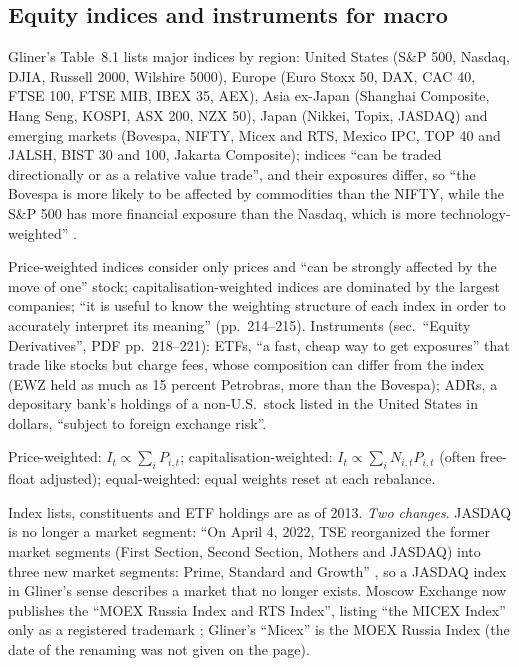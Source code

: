 \subsection{Equity indices and instruments for macro}

\begin{qfdefinition}\label{def:equity-indices-derivatives}
 Gliner's Table~8.1 lists major indices by region: United States (S\&P 500, Nasdaq, DJIA, Russell 2000, Wilshire 5000), Europe (Euro Stoxx 50, DAX, CAC 40, FTSE 100, FTSE MIB, IBEX 35, AEX), Asia ex-Japan (Shanghai Composite, Hang Seng, KOSPI, ASX 200, NZX 50), Japan (Nikkei, Topix, JASDAQ) and emerging markets (Bovespa, NIFTY, Micex and RTS, Mexico IPC, TOP 40 and JALSH, BIST 30 and 100, Jakarta Composite); indices ``can be traded directionally or as a relative value trade'', and their exposures differ, so ``the Bovespa is more likely to be affected by commodities than the NIFTY, while the S\&P 500 has more financial exposure than the Nasdaq, which is more technology-weighted'' \citep[chap.~8, sec.\ ``Equity Indices Overview'', PDF pp.~214--215]{s7-gliner}.

Price-weighted indices consider only prices and ``can be strongly affected by the move of one'' stock; capitalisation-weighted indices are dominated by the largest companies; ``it is useful to know the weighting structure of each index in order to accurately interpret its meaning'' (pp.~214--215). Instruments (sec.\ ``Equity Derivatives'', PDF pp.~218--221): ETFs, ``a fast, cheap way to get exposures'' that trade like stocks but charge fees, whose composition can differ from the index (EWZ held as much as 15 percent Petrobras, more than the Bovespa); ADRs, a depositary bank's holdings of a non-U.S.\ stock listed in the United States in dollars, ``subject to foreign exchange risk''.

 Price-weighted: $I_t\propto\sum_i P_{i,t}$; capitalisation-weighted: $I_t\propto\sum_i N_{i,t}P_{i,t}$ (often free-float adjusted); equal-weighted: equal weights reset at each rebalance.

 Index lists, constituents and ETF holdings are as of 2013. \emph{Two changes}. JASDAQ is no longer a market segment: ``On April 4, 2022, TSE reorganized the former market segments (First Section, Second Section, Mothers and JASDAQ) into three new market segments: Prime, Standard and Growth'' \citep[market-structure page]{jpx-market-restructure}, so a JASDAQ index in Gliner's sense describes a market that no longer exists. Moscow Exchange now publishes the ``MOEX Russia Index and RTS Index'', listing ``the MICEX Index'' only as a registered trademark \citep[index page]{moex-indices}; Gliner's ``Micex'' is the MOEX Russia Index (the date of the renaming was not given on the page).


\end{qfdefinition}

